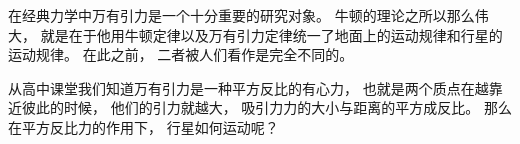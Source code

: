 
\begin{issues}
\issueDraft
\end{issues}

在经典力学中万有引力是一个十分重要的研究对象。 牛顿的理论之所以那么伟大， 就是在于他用牛顿定律以及万有引力定律统一了地面上的运动规律和行星的运动规律。 在此之前， 二者被人们看作是完全不同的。

从高中课堂我们知道万有引力是一种平方反比的有心力， 也就是两个质点在越靠近彼此的时候， 他们的引力就越大， 吸引力力的大小与距离的平方成反比。 那么在平方反比力的作用下， 行星如何运动呢？

